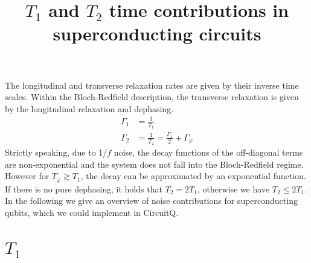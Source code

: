 \documentclass[]{article}
\title{$T_1$ and $T_2$ time contributions in superconducting circuits}
\date{} %
\begin{document}
	\maketitle
The longitudinal and transverse relaxation rates are given by their inverse time scales. Within the Bloch-Redfield description, the transverse relaxation is given by the longitudinal relaxation and dephasing.~\cite{krantz2019}
\begin{align}
\Gamma_1 &= \frac{1}{T_1} \\
\Gamma_2 &= \frac{1}{T_2} =  \frac{\Gamma_1}{2} + \Gamma_{\varphi}  
\end{align}
Strictly speaking, due to 1/$f$ noise, the decay functions of the off-diagonal terms are non-exponential and the system does not fall into the Bloch-Redfield regime. However for $T_{\varphi}   \gtrsim T_1$, the decay can be approximated by an exponential function. If there is no pure dephasing, it holds that $T_2 = 2T_1$, otherwise we have $T_2 \leq 2 T_1$. 
In the following we give an overview of noise contributions for superconducting qubits, which we could implement in CircuitQ.
\section{$T_1$}
\end{document}
